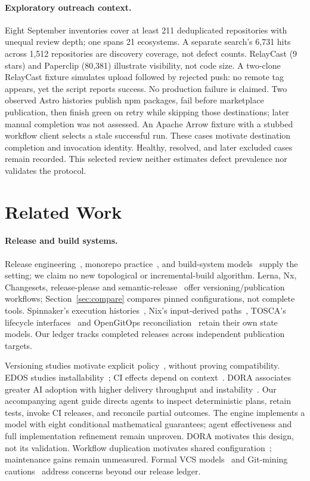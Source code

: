 \paragraph{Exploratory outreach context.}
Eight September inventories cover at least 211 deduplicated repositories with
unequal review depth; one spans 21 ecosystems. A separate search's 6,731 hits
across 1,512 repositories are discovery coverage, not defect counts.
RelayCast (9 stars) and Paperclip (80,381) illustrate visibility, not code size.
A two-clone RelayCast fixture simulates upload followed by rejected push:
no remote tag appears, yet the script reports success. No production failure
is claimed. Two observed Astro histories publish npm packages, fail before
marketplace publication, then finish green on retry while skipping those
destinations; later manual completion was not assessed. An Apache Arrow
fixture with a stubbed workflow client selects a stale successful run.
These cases motivate destination completion and invocation identity.
Healthy, resolved, and later excluded cases remain recorded. This selected
review neither estimates defect prevalence nor validates the protocol.

\section{Related Work}
\label{sec:related}
\paragraph{Release and build systems.}
Release engineering~\cite{adams}, monorepo practice~\cite{potvin}, and build-system
models~\cite{mokhov,pluto} supply the setting; we claim no new topological or
incremental-build algorithm. Lerna, Nx, Changesets, release-please and
semantic-release~\cite{lerna,nx,changesets,releaseplease,semanticrelease} offer
versioning/publication workflows; Section~\ref{sec:compare} compares pinned
configurations, not complete tools. Spinnaker's execution histories~\cite{spinnaker},
Nix's input-derived paths~\cite{nix}, TOSCA's lifecycle interfaces~\cite{tosca}
and OpenGitOps reconciliation~\cite{gitops} retain their own state models.
Our ledger tracks completed releases across independent publication targets.

Versioning studies motivate explicit policy~\cite{raemaekers,bogart,decan},
without proving compatibility. EDOS studies installability~\cite{edos};
CI effects depend on context~\cite{huangci}.
DORA associates greater AI adoption with higher delivery throughput and
instability~\cite{dora2025}. Our accompanying agent guide directs agents to
inspect deterministic plans, retain tests, invoke CI releases, and reconcile
partial outcomes. The engine implements a model with eight conditional
mathematical guarantees; agent effectiveness and full implementation refinement
remain unproven. DORA motivates this design, not its validation.
Workflow duplication motivates shared configuration~\cite{cardoen};
maintenance gains remain unmeasured. Formal VCS models~\cite{swierstraloh,hpt,mimram,mrdt}
and Git-mining cautions~\cite{birdgit} address concerns beyond our release ledger.

